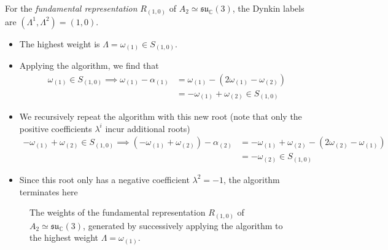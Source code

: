 \begin{example}[]
  For the \emph{fundamental representation} $R_{(1, 0)}$ of $A_2 \simeq \mathfrak{su}_{\mathbb{C}}(3)$, the Dynkin labels are $(\Lambda^1, \Lambda^2) = (1, 0)$.
  \begin{itemize}
    \item The highest weight is $\Lambda = \omega_{(1)} \in S_{(1, 0)}.$
    \item Applying the algorithm, we find that
    \begin{align}
      \omega_{(1)} \in S_{(1, 0)} \implies \omega_{(1)} - \alpha_{(1)} &= \omega_{(1)} - (2 \omega_{(1)} - \omega_{(2)}) \\
			     &= - \omega_{(1)} + \omega_{(2)} \in S_{(1, 0)}
    \end{align}
  \item We recursively repeat the algorithm with this new root (note that only the positive coefficients $\lambda^{i}$ incur additional roots)
    \begin{align}
      -\omega_{(1)} + \omega_{(2)} \in S_{(1, 0)} \implies (-\omega_{(1)} + \omega_{(2)})  - \alpha_{(2)} &= -\omega_{(1)} + \omega_{(2)} - (2 \omega_{(2)} - \omega_{(1)}) \\
						   &= -\omega_{(2)} \in S_{(1, 0)}
    \end{align}
  \item Since this root only has a negative coefficient $\lambda^{2} = -1$, the algorithm terminates here
  \end{itemize}
\end{example} 

\begin{figure}[tbhp]
  \centering
  \def\svgwidth{0.4\columnwidth}
  
  \caption{The weights of the fundamental representation $R_{(1, 0)}$ of $A_2 \simeq \mathfrak{su}_{\mathbb{C}}(3)$, generated by successively applying the algorithm to the highest weight $\Lambda = \omega_{(1)}$.}
  \label{fig:l22f2}
\end{figure}

